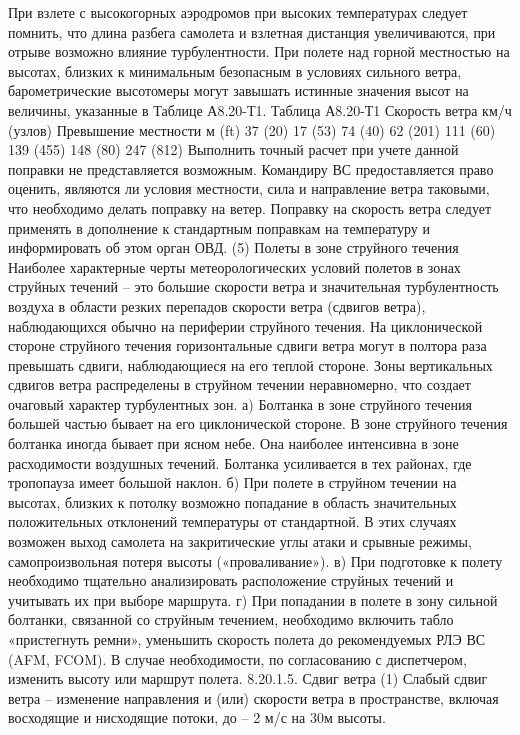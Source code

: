 При взлете с высокогорных аэродромов при высоких температурах следует помнить, что длина разбега самолета и взлетная дистанция увеличиваются, при отрыве возможно влияние турбулентности. При полете над горной местностью на высотах, близких к минимальным безопасным в условиях сильного ветра, барометрические высотомеры могут завышать истинные значения высот на величины, указанные в Таблице А8.20-Т1.
                                                                         Таблица А8.20-Т1
Скорость ветра км/ч (узлов)	Превышение местности м (ft)
37 (20)	17 (53)
74 (40)	62 (201)
111 (60)	139 (455)
148 (80)	247 (812)
Выполнить точный расчет при учете данной поправки не представляется возможным.
Командиру ВС предоставляется право оценить, являются ли условия местности, сила и направление ветра таковыми, что необходимо делать поправку на ветер. Поправку на скорость ветра следует применять в дополнение к стандартным поправкам на температуру и информировать об этом орган ОВД.
(5) Полеты в зоне струйного течения
Наиболее характерные черты метеорологических условий полетов в зонах струйных течений – это большие скорости ветра и значительная турбулентность воздуха в области резких перепадов скорости ветра (сдвигов ветра), наблюдающихся обычно на периферии струйного течения. На циклонической стороне струйного течения горизонтальные сдвиги ветра могут в полтора раза превышать сдвиги, наблюдающиеся на его теплой стороне. Зоны вертикальных сдвигов ветра распределены в струйном течении неравномерно, что создает очаговый характер турбулентных зон.
а)	Болтанка в зоне струйного течения большей частью бывает на его циклонической стороне. В зоне струйного течения болтанка иногда бывает при ясном небе. Она наиболее интенсивна в зоне расходимости воздушных течений. Болтанка усиливается в тех районах, где тропопауза имеет большой наклон.
б)	При полете в струйном течении на высотах, близких к потолку возможно попадание в область значительных положительных отклонений температуры от стандартной. В этих случаях возможен выход самолета на закритические углы атаки и срывные режимы, самопроизвольная потеря высоты («проваливание»).
в)	При подготовке к полету необходимо тщательно анализировать расположение струйных течений и учитывать их при выборе маршрута.
г)	При попадании в полете в зону сильной болтанки, связанной со струйным течением, необходимо включить табло «пристегнуть ремни», уменьшить скорость полета до рекомендуемых РЛЭ ВС (AFM, FCOM). В случае необходимости, по согласованию с диспетчером, изменить высоту или маршрут полета.
8.20.1.5.	Сдвиг ветра
(1) Слабый сдвиг ветра – изменение направления и (или) скорости ветра в пространстве, включая восходящие и нисходящие потоки, до – 2 м/с на 30м высоты.
